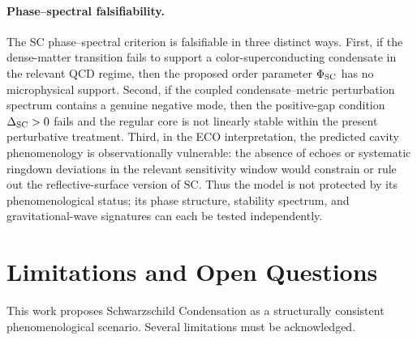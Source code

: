 \documentclass[epj]{svjour}
\begin{document}
\paragraph{Phase--spectral falsifiability.}
The SC phase--spectral criterion is falsifiable in three distinct ways. First, if the dense-matter transition fails to support a color-superconducting condensate in the relevant QCD regime, then the proposed order parameter $\Phi_{\rm SC}$ has no microphysical support. Second, if the coupled condensate--metric perturbation spectrum contains a genuine negative mode, then the positive-gap condition $\Delta_{\rm SC}>0$ fails and the regular core is not linearly stable within the present perturbative treatment. Third, in the ECO interpretation, the predicted cavity phenomenology is observationally vulnerable: the absence of echoes or systematic ringdown deviations in the relevant sensitivity window would constrain or rule out the reflective-surface version of SC. Thus the model is not protected by its phenomenological status; its phase structure, stability spectrum, and
gravitational-wave signatures can each be tested independently.

\section{Limitations and Open Questions}
\label{sec:limitations}

This work proposes Schwarzschild Condensation as a structurally consistent phenomenological scenario. Several limitations must be acknowledged.
\end{document}

